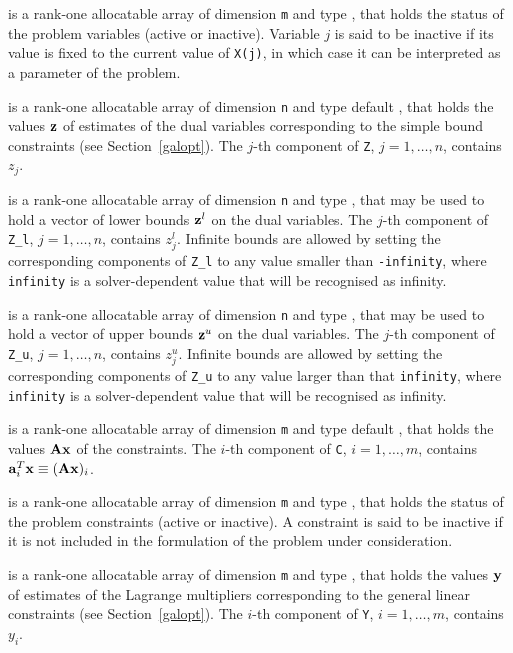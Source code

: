 \documentclass{galahad}
\begin{document}
\begin{description}
 is a rank-one allocatable array of dimension {\tt m} and type
\integer, that holds the status of the problem variables (active or
inactive). Variable $j$ is said to be inactive if its value is fixed to the
current value of {\tt X(j)}, in which case it can be interpreted as a
parameter of the problem.

 is a rank-one allocatable array of dimension {\tt n} and type default
\realdp, that holds
the values ${\mathbf{z}}$ of estimates  of the dual variables
corresponding to the simple bound constraints (see Section~\ref{galopt}).
The $j$-th component of {\tt Z}, $j = 1,  \ldots ,  n$, contains $z_{j}$.

 is a rank-one allocatable array of dimension {\tt n} and type
\realdp, that may be used to hold
a vector of lower bounds ${\mathbf{z}}^{l}$ on the dual variables.
The $j$-th component of {\tt Z\_l}, $j = 1, \ldots , n$,
contains $z_{j}^{l}$.
Infinite bounds are allowed by setting the corresponding
components of {\tt Z\_l} to any value smaller than {\tt -infinity},
where {\tt infinity} is a  solver-dependent value that will be recognised as
infinity.

 is a rank-one allocatable array of dimension {\tt n} and type
\realdp, that may be used to hold
a vector of upper bounds ${\mathbf{z}}^{u}$ on the dual variables.
The $j$-th component of {\tt Z\_u}, $j = 1, \ldots , n$,
contains $z_{j}^{u}$.
Infinite bounds are allowed by setting the corresponding
components of {\tt Z\_u} to any value larger than that {\tt infinity},
where {\tt infinity} is a  solver-dependent value that will be recognised as
infinity.

 is a rank-one allocatable array of dimension {\tt m} and type default
\realdp, that holds
the values ${\mathbf{A}} {\mathbf{x}}$ of the constraints.
The $i$-th component of {\tt C}, $i = 1,  \ldots ,  m$, contains
${\mathbf{a}}_{i}^{T}{\mathbf{x}} \equiv ({\mathbf{A}} {\mathbf{x}})_{i}$.

 is a rank-one allocatable array of dimension {\tt m} and type
\integer, that holds the status of the problem constraints (active or
inactive). A constraint is said to be inactive if it is not included in the
formulation of the problem under consideration.

 is a rank-one allocatable array of dimension {\tt m} and type
\realdp, that holds
the values ${\mathbf{y}}$ of estimates  of the Lagrange multipliers
corresponding to the general linear constraints (see Section~\ref{galopt}).
The $i$-th component of {\tt Y}, $i = 1,  \ldots ,  m$, contains $y_{i}$.


\end{description}
\end{document}
